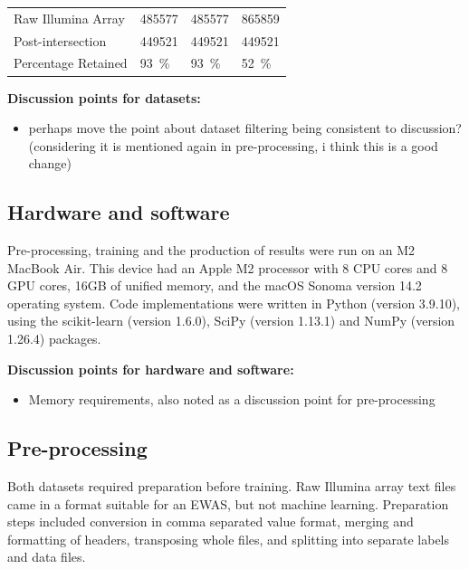 \documentclass{article}
\begin{document}
\begin{table}
\begin{tabularx}{\textwidth}{X >{\raggedleft\arraybackslash}X >{\raggedleft\arraybackslash}X >{\raggedleft\arraybackslash}X}
        \midrule
        Raw Illumina Array                   & \num{485577}                                  & \num{485577}                                 & \num{865859}                          \\
        Post-intersection                    & \num{449521}                                  & \num{449521}                                 & \num{449521}                          \\
        Percentage Retained                  & \SI{93}{\percent}                             & \SI{93}{\percent}                            & \SI{52}{\percent}                     \\
        \bottomrule
    \end{tabularx}
\end{table}

\vspace{1cm}
\textbf{Discussion points for datasets:}
\begin{itemize}
    \item perhaps move the point about dataset filtering being consistent to discussion? (considering it is mentioned again in pre-processing, i think this is a good change)
\end{itemize}

\subsection{Hardware and software}
Pre-processing, training and the production of results were run on an M2 MacBook Air. This device had an Apple M2 processor with 8 CPU cores and 8 GPU cores, 16GB of unified memory, and the macOS Sonoma version 14.2 operating system. Code implementations were written in Python (version 3.9.10), using the scikit-learn (version 1.6.0), SciPy (version 1.13.1) and NumPy (version 1.26.4) packages.

\textbf{Discussion points for hardware and software:}
\begin{itemize}
    \item Memory requirements, also noted as a discussion point for pre-processing
\end{itemize}

\subsection{Pre-processing} \label{sec:pre-processing}
Both datasets required preparation before training. Raw Illumina array text files came in a format suitable for an EWAS, but not machine learning. Preparation steps included conversion in comma separated value format, merging and formatting of headers, transposing whole files, and splitting into separate labels and data files.
\end{document}
